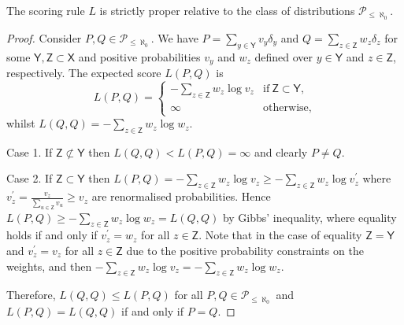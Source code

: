 \documentclass[10pt,a4paper]{amsart}
\begin{document}
\begin{proposition}
    The scoring rule $L$ is strictly proper relative to the class of distributions $\mathcal{P}_{\le \aleph_0}$. 
\end{proposition}

\begin{proof}
    Consider $P,Q \in \mathcal{P}_{\le \aleph_0}$. We have $P = \sum_{y \in \mathsf{Y}} v_y \delta_{y}$ and $Q = \sum_{z \in \mathsf{Z}} w_z \delta_{z}$ for some $\mathsf{Y}, \mathsf{Z}\subset \mathsf{X}$ and positive probabilities $v_y$ and $w_z$ defined over $y \in \mathsf{Y}$ and $z \in \mathsf{Z}$, respectively. The expected score $L(P,Q)$ is
\begin{equation*}
    L(P,Q) = 
    \begin{cases}
        -\sum_{z\in \mathsf{Z}}w_{z} \log v_z & \text{if}~\mathsf{Z} \subset \mathsf{Y}, \\
        \infty & \text{otherwise,}
    \end{cases}      
\end{equation*}
whilst $L(Q,Q) = -\sum_{z\in \mathsf{Z}}w_{z} \log w_z$.

Case 1. If $\mathsf{Z} \not\subset \mathsf{Y}$ then $L(Q,Q)<L(P,Q)=\infty$ and clearly $P \neq Q$.

Case 2. If $\mathsf{Z} \subset \mathsf{Y}$ then 
$L(P,Q) = -\sum_{z\in \mathsf{Z}}w_{z} \log v_z \geq -\sum_{z\in \mathsf{Z}}w_{z} \log v_z^\prime$ where $v_z^\prime = \frac{v_z}{\sum_{u\in \mathsf{Z}} v_u} \geq v_z$ are renormalised probabilities. Hence 
$L(P,Q) \geq -\sum_{z\in \mathsf{Z}}w_{z} \log w_z = L(Q,Q)$ by Gibbs' inequality, where equality holds if and only if $v_z^\prime = w_z$ for all $z \in \mathsf{Z}$. Note that in the case of equality $\mathsf{Z}=\mathsf{Y}$ and $v_z^\prime = v_z$ for all $z \in \mathsf{Z}$ due to the positive probability constraints on the weights, and then $-\sum_{z\in \mathsf{Z}}w_{z} \log v_z = -\sum_{z\in \mathsf{Z}}w_{z} \log w_z$.

Therefore, $L(Q,Q) \leq L(P,Q)$ for all $P,Q\in \mathcal{P}_{\le \aleph_0}$ and $L(P,Q) = L(Q,Q)$ if and only if $P=Q$.

\end{proof}
\end{document}
